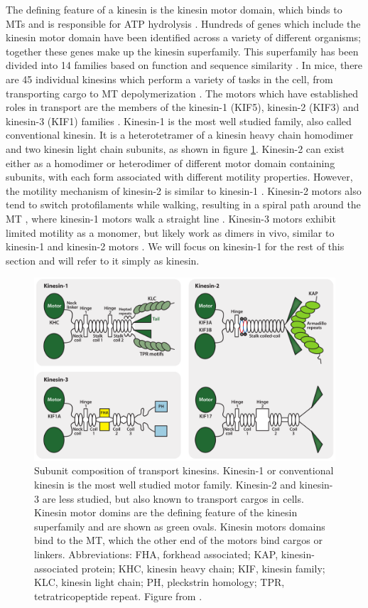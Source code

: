 The defining feature of a kinesin is the kinesin motor domain, which binds to MTs and is responsible for ATP hydrolysis \cite{Verhey2011}. Hundreds of genes which include the kinesin motor domain have been identified across a variety of different organisms; together these genes make up the kinesin superfamily. This superfamily has been divided into 14 families based on function and sequence similarity \cite{Lawrence2004}. In mice, there are 45 individual kinesins which perform a variety of tasks in the cell, from transporting cargo to MT depolymerization \cite{Hirokawa2009}. The motors which have established roles in transport are the members of the kinesin-1 (KIF5), kinesin-2 (KIF3) and kinesin-3 (KIF1) families \cite{Verhey2011}. Kinesin-1 is the most well studied family, also called conventional kinesin. It is a heterotetramer of a kinesin heavy chain homodimer and two kinesin light chain subunits, as shown in figure \ref{fig:kinesin_types}. Kinesin-2 can exist either as a homodimer or heterodimer of different motor domain containing subunits, with each form associated with different motility properties. However, the motility mechanism of kinesin-2 is similar to kinesin-1 \cite{Andreasson2015}. Kinesin-2 motors also tend to switch protofilaments while walking, resulting in a spiral path around the MT \cite{Brunnbauer2012}, where kinesin-1 motors walk a straight line \cite{Ray1993}. Kinesin-3 motors exhibit limited motility as a monomer, but likely work as dimers in vivo, similar to kinesin-1 and kinesin-2 motors \cite{Siddiqui2017}. We will focus on kinesin-1 for the rest of this section and will refer to it simply as kinesin.

\begin{figure}
\includegraphics[width=\textwidth]{background/kinesin_types}
\caption[Composition of transport kinesins]{Subunit composition of transport kinesins. Kinesin-1 or conventional kinesin is the most well studied motor family. Kinesin-2 and kinesin-3 are less studied, but also known to transport cargos in cells. Kinesin motor domins are the defining feature of the kinesin superfamily and are shown as green ovals. Kinesin motors domains bind to the MT, which the other end of the motors bind cargos or linkers. Abbreviations: FHA, forkhead associated; KAP, kinesin-associated protein; KHC, kinesin heavy chain; KIF, kinesin family; KLC, kinesin light chain; PH, pleckstrin homology; TPR, tetratricopeptide repeat. Figure from \cite{Verhey2011}.}
\label{fig:kinesin_types}
\end{figure}

